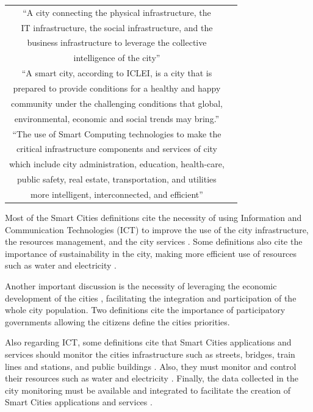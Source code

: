 \begin{table}
\begin{tabular}{c|c}
“A city connecting the physical infrastructure, the\\
IT infrastructure, the social infrastructure, and the\\
business infrastructure to leverage the collective\\
intelligence of the city”
& \cite{harrison2010foundations} \\\hline

“A smart city, according to ICLEI, is a city that is\\ 
prepared to provide conditions for a healthy and happy\\
community under the challenging conditions that global,\\
environmental, economic and social trends may bring.”  & \cite{guan2012smart} \\\hline

“The use of Smart Computing technologies to make the\\ 
critical infrastructure components and services of city\\
which include city administration, education, health-care,\\ 
public safety, real estate, transportation, and utilities\\
more intelligent, interconnected, and efficient”
& \cite{washburn2009helping} \\\hline

\end{tabular}
\end{table}

Most of the Smart Cities definitions cite the necessity of using Information and Communication Technologies (ICT) to improve the use of the city infrastructure, the resources management, and the city services \cite{harrison2010foundations,washburn2009helping}. Some definitions also cite the importance of sustainability in the city, making more efficient use of resources such as water and electricity \cite{caragliu2011smart,dameri2013searching}.

Another important discussion is the necessity of leveraging the economic development of the cities \cite{dameri2013searching}, facilitating the integration and participation of the whole city population. Two definitions \cite{dameri2013searching,giffinger2007smart} cite the importance of participatory governments allowing the citizens define the cities priorities.

Also regarding ICT, some definitions cite that Smart Cities applications and services should monitor the cities infrastructure such as streets, bridges, train lines and stations, and public buildings \cite{hall2000creative}. Also, they must monitor and control their resources such as water and electricity \cite{hall2000creative}. Finally, the data collected in the city monitoring must be available and integrated to facilitate the creation of Smart Cities applications and services \cite{harrison2010foundations,washburn2009helping}.

